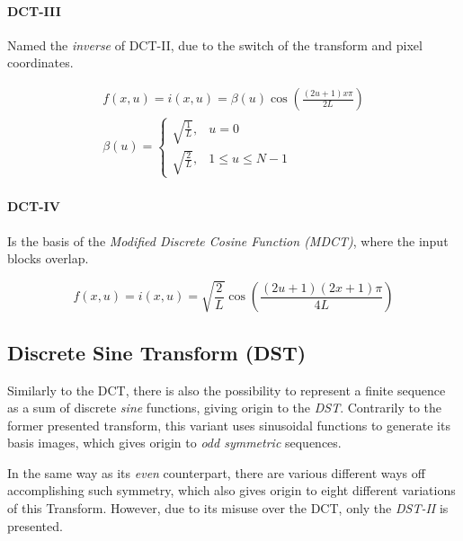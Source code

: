 \paragraph{DCT-III}
Named the \emph{inverse} of DCT-II, due to the switch of the transform and pixel coordinates.

\begin{gather}
    f(x,u) = i(x,u) = \beta(u)\cos\left(\frac{(2u+1)x\pi }{2L}\right) \\
    \beta(u)= \begin{cases}
                    \sqrt{\frac{1}{L}}, & u=0 \\
                    \sqrt{\frac{2}{L}}, & 1 \leq u \leq N-1
                \end{cases}
\end{gather}

\paragraph{DCT-IV}

Is the basis of the \emph{Modified Discrete Cosine Function (MDCT)}, where the input blocks overlap.

\nocite{DiscreteCosineTransform}

\begin{equation}
    f(x,u) = i(x,u) = \sqrt{\frac{2}{L}}\cos\left(\frac{(2u+1)(2x+1)\pi }{4L}\right)
\end{equation}

\subsection{Discrete Sine Transform (DST)}

\nocite{prattDigitalImageProcessing2001}

Similarly to the DCT, there is also the possibility to represent a finite sequence as a sum of discrete \emph{sine} functions, giving origin to the \emph{DST}. Contrarily to the former presented transform, this variant uses sinusoidal functions to generate its basis images, which gives origin to \emph{odd symmetric} sequences.

In the same way as its \emph{even} counterpart, there are various different ways off accomplishing such symmetry, which also gives origin to eight different variations of this Transform. However, due to its misuse over the DCT, only the \emph{DST-II} is presented.

